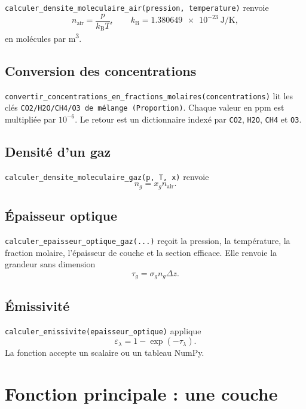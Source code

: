 \documentclass[11pt,a4paper]{article}
\begin{document}
\texttt{calculer\_densite\_moleculaire\_air(pression, temperature)} renvoie
\begin{equation}
  n_{\mathrm{air}}=\frac{p}{k_{\mathrm B}T},\qquad
  k_{\mathrm B}=\SI{1.380649e-23}{\joule\per\kelvin},
\end{equation}
en molécules par \si{\metre\cubed}.

\subsection{Conversion des concentrations}

\texttt{convertir\_concentrations\_en\_fractions\_molaires(concentrations)}
lit les clés \texttt{CO2/H2O/CH4/O3 de mélange (Proportion)}. Chaque valeur
en ppm est multipliée par $10^{-6}$. Le retour est un dictionnaire indexé par
\texttt{CO2}, \texttt{H2O}, \texttt{CH4} et \texttt{O3}.

\subsection{Densité d'un gaz}

\texttt{calculer\_densite\_moleculaire\_gaz(p, T, x)} renvoie
\begin{equation}
  n_g=x_g n_{\mathrm{air}}.
\end{equation}

\subsection{Épaisseur optique}

\texttt{calculer\_epaisseur\_optique\_gaz(...)} reçoit la pression, la
température, la fraction molaire, l'épaisseur de couche et la section efficace.
Elle renvoie la grandeur sans dimension
\begin{equation}
  \tau_g=\sigma_g n_g\Delta z.
\end{equation}

\subsection{Émissivité}

\texttt{calculer\_emissivite(epaisseur\_optique)} applique
\begin{equation}
  \varepsilon_\lambda=1-\exp(-\tau_\lambda).
\end{equation}
La fonction accepte un scalaire ou un tableau NumPy.

\section{Fonction principale : une couche}
\end{document}
